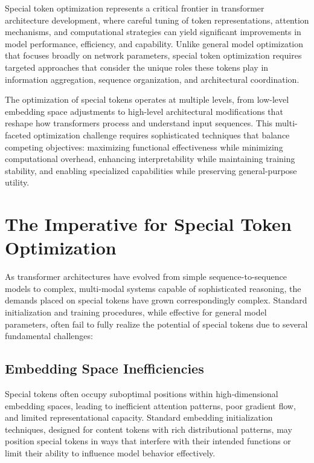 
Special token optimization represents a critical frontier in transformer architecture development, where careful tuning of token representations, attention mechanisms, and computational strategies can yield significant improvements in model performance, efficiency, and capability. Unlike general model optimization that focuses broadly on network parameters, special token optimization requires targeted approaches that consider the unique roles these tokens play in information aggregation, sequence organization, and architectural coordination.

The optimization of special tokens operates at multiple levels, from low-level embedding space adjustments to high-level architectural modifications that reshape how transformers process and understand input sequences. This multi-faceted optimization challenge requires sophisticated techniques that balance competing objectives: maximizing functional effectiveness while minimizing computational overhead, enhancing interpretability while maintaining training stability, and enabling specialized capabilities while preserving general-purpose utility.

\section{The Imperative for Special Token Optimization}

As transformer architectures have evolved from simple sequence-to-sequence models to complex, multi-modal systems capable of sophisticated reasoning, the demands placed on special tokens have grown correspondingly complex. Standard initialization and training procedures, while effective for general model parameters, often fail to fully realize the potential of special tokens due to several fundamental challenges:

\subsection{Embedding Space Inefficiencies}

Special tokens often occupy suboptimal positions within high-dimensional embedding spaces, leading to inefficient attention patterns, poor gradient flow, and limited representational capacity. Standard embedding initialization techniques, designed for content tokens with rich distributional patterns, may position special tokens in ways that interfere with their intended functions or limit their ability to influence model behavior effectively.


